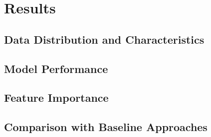 \section{Results}

\subsection{Data Distribution and Characteristics}

\subsection{Model Performance}

\subsection{Feature Importance}

\subsection{Comparison with Baseline Approaches}
